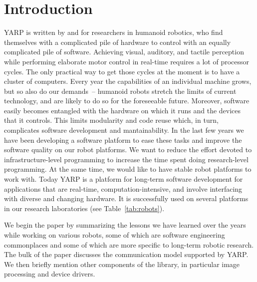 
\section{Introduction}

YARP is written by and for researchers in humanoid robotics, who find
themselves with a complicated pile of hardware to control with an
equally complicated pile of software.
%
%
Achieving visual, auditory, and tactile
perception while performing elaborate motor control in real-time
requires a lot of processor cycles. The only practical way to get
those cycles at the moment is to have a cluster of computers. Every
year the capabilities of an individual machine grows, but so also do our demands~--
humanoid robots stretch the limits of current technology, and are
likely to do so for the foreseeable future.
Moreover, software easily becomes entangled with the hardware on which it runs and the
devices that it controls.
This limits modularity and code reuse which, in turn, complicates software 
development and mantainability. In the last few years we have been developing
a software platform to ease these tasks and improve the software quality on 
our robot platforms. 
We want to reduce the effort devoted to infrastructure-level programming to increase the 
time spent doing research-level programming. At the same time, we would like to have 
stable robot platforms to work with.
Today YARP is a platform for long-term software 
development for applications that are real-time, computation-intensive, 
and involve interfacing with diverse and changing hardware. It is
successfully used on several platforms in our research laboratories
(see Table~\ref{tab:robots}).
%

We begin the paper by summarizing the lessons we have learned over
the years while working on various robots, some of which are 
software engineering commonplaces and some of which are more
specific to long-term robotic research.  The bulk of the paper 
discusses the communication model supported by YARP.  We then
briefly mention other components of the library, in particular
image processing and device drivers.

